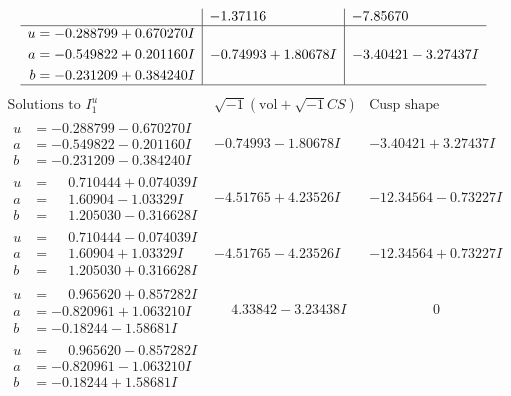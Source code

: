 \documentclass[1p]{elsarticle_modified}
\theoremstyle{definition}
\newcommand{\I}{\sqrt{-1}}
\begin{document}
$$\begin{array}{c|c|c}
 & -1.37116\phantom{ +0.000000I} & -7.85670\phantom{ +0.000000I} \\ \hline\begin{aligned}
u &= -0.288799 + 0.670270 I \\
a &= -0.549822 + 0.201160 I \\
b &= -0.231209 + 0.384240 I\end{aligned}
 & -0.74993 + 1.80678 I & -3.40421 - 3.27437 I\\
 \hline 
 \end{array}$$\newpage$$\begin{array}{c|c|c}  
\text{Solutions to }I^u_{1}& \I (\text{vol} + \sqrt{-1}CS) & \text{Cusp shape}\\
 \hline 
\begin{aligned}
u &= -0.288799 - 0.670270 I \\
a &= -0.549822 - 0.201160 I \\
b &= -0.231209 - 0.384240 I\end{aligned}
 & -0.74993 - 1.80678 I & -3.40421 + 3.27437 I \\ \hline\begin{aligned}
u &= \phantom{-}0.710444 + 0.074039 I \\
a &= \phantom{-}1.60904 - 1.03329 I \\
b &= \phantom{-}1.205030 - 0.316628 I\end{aligned}
 & -4.51765 + 4.23526 I & -12.34564 - 0.73227 I \\ \hline\begin{aligned}
u &= \phantom{-}0.710444 - 0.074039 I \\
a &= \phantom{-}1.60904 + 1.03329 I \\
b &= \phantom{-}1.205030 + 0.316628 I\end{aligned}
 & -4.51765 - 4.23526 I & -12.34564 + 0.73227 I \\ \hline\begin{aligned}
u &= \phantom{-}0.965620 + 0.857282 I \\
a &= -0.820961 + 1.063210 I \\
b &= -0.18244 - 1.58681 I\end{aligned}
 & \phantom{-}4.33842 - 3.23438 I & \phantom{-0.000000 } 0 \\ \hline\begin{aligned}
u &= \phantom{-}0.965620 - 0.857282 I \\
a &= -0.820961 - 1.063210 I \\
b &= -0.18244 + 1.58681 I\end{aligned}

\end{array}$$
\end{document}
